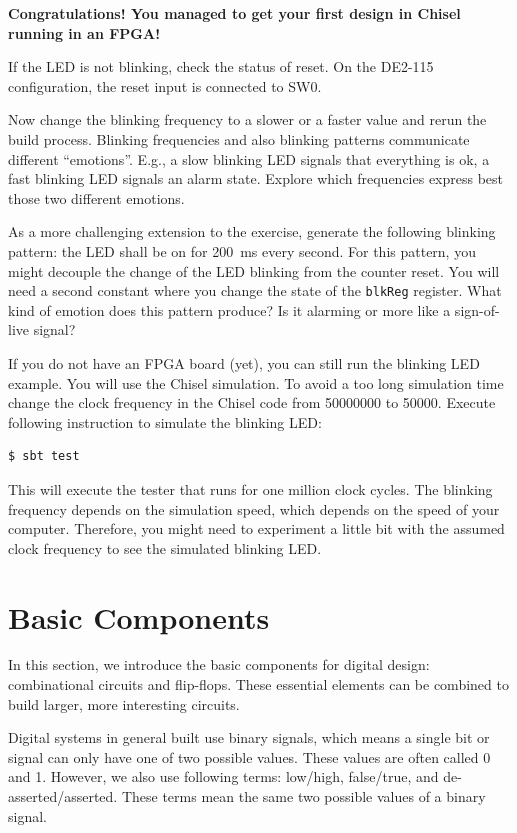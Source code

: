 \documentclass[%
    10pt,
    headinclude, footexclude,
    openright, %
    notitlepage,
    cleardoubleempty,
    headsepline,
    pointlessnumbers,
    bibtotoc, idxtotoc,
    ]{scrbook}
\newcommand{\code}[1]{{\small{\texttt{#1}}}}
\begin{document}
{\bf Congratulations! You managed to get your first design in Chisel running in an FPGA!}

If the LED is not blinking, check the status of reset. On the DE2-115 configuration,
the reset input is connected to SW0.

Now change the blinking frequency to a slower or a faster value and
rerun the build process. Blinking frequencies and also blinking patterns
communicate different ``emotions''. E.g., a slow blinking LED signals that
everything is ok, a fast blinking LED signals an alarm state.
Explore which frequencies express best those two different emotions.

As a more challenging extension to the exercise, generate the following blinking pattern:
the LED shall be on for 200~ms every second. For this pattern, you might
decouple the change of the LED blinking from the counter reset.
You will need a second constant where you change the state of the
\code{blkReg} register. What kind of emotion does this pattern produce?
Is it alarming or more like a sign-of-live signal?

If you do not have an FPGA board (yet), you can still run the blinking LED example.
You will use  the Chisel simulation. To avoid a too long simulation time change the
clock frequency in the Chisel code from 50000000 to 50000. Execute following
instruction to simulate the blinking LED:

\begin{verbatim}
$ sbt test
\end{verbatim}

This will execute the tester that runs for one million clock cycles.
The blinking frequency depends on the simulation speed, which depends on the
speed of your computer. Therefore, you might need to experiment a little bit
with the assumed clock frequency to see the simulated blinking LED.

\chapter{Basic Components}

In this section, we introduce the basic components for digital design:
combinational circuits and flip-flops.
These essential elements can be combined to build larger, more interesting circuits.

Digital systems in general built use binary signals, which means a single bit or signal
can only have one of two possible values. These values are often called 0 and 1. However, we
also use following terms: low/high, false/true, and de-asserted/asserted.
These terms mean the same two possible values of a binary signal.
\end{document}
